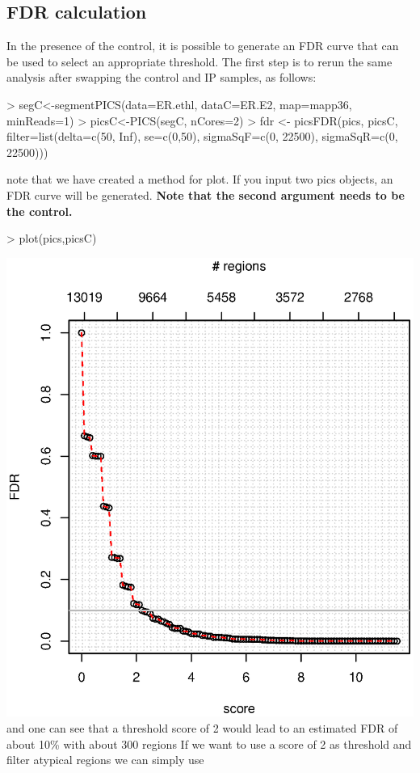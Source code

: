 \documentclass[12pt]{article}
\begin{document}
\subsection{FDR calculation}
In the presence of the control, it is possible to generate an FDR curve that can be used to select an appropriate threshold. The first step is to rerun the same analysis after swapping the control and IP samples, as follows:
\begin{Schunk}
\begin{Sinput}
> segC<-segmentPICS(data=ER.ethl, dataC=ER.E2, map=mapp36, minReads=1)
> picsC<-PICS(segC, nCores=2)
> fdr <- picsFDR(pics, picsC, filter=list(delta=c(50, Inf), se=c(0,50), sigmaSqF=c(0, 22500), sigmaSqR=c(0, 22500)))
\end{Sinput}
\end{Schunk}
note that we have created a method for plot. If you input two pics objects, an FDR curve will be generated. \textbf{Note that the second argument needs to be the control.}
\begin{Schunk}
\begin{Sinput}
> plot(pics,picsC)
\end{Sinput}
\end{Schunk}
\includegraphics{chipData_AD-PICS-FDR}
and one can see that a threshold score of 2 would lead to an estimated FDR of about 10\% with about 300 regions
If we want to use a score of 2 as threshold and filter atypical regions we can simply use
\end{document}
